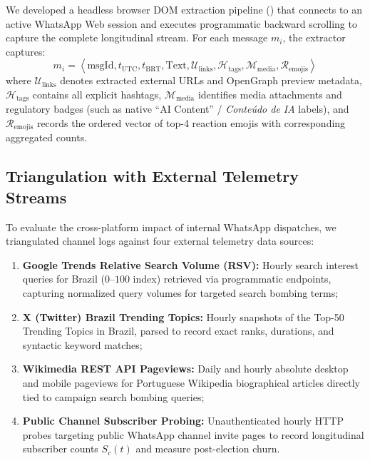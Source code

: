 \documentclass[preprint,12pt]{elsarticle}
\begin{document}
We developed a headless browser DOM extraction pipeline () that connects to an active WhatsApp Web session and executes programmatic backward scrolling to capture the complete longitudinal stream. For each message $m_i$, the extractor captures:
\begin{equation}
m_i = \left\langle \text{msgId}, t_{\text{UTC}}, t_{\text{BRT}}, \text{Text}, \mathcal{U}_{\text{links}}, \mathcal{H}_{\text{tags}}, \mathcal{M}_{\text{media}}, \mathcal{R}_{\text{emojis}} \right\rangle
\end{equation}
where $\mathcal{U}_{\text{links}}$ denotes extracted external URLs and OpenGraph preview metadata, $\mathcal{H}_{\text{tags}}$ contains all explicit hashtags, $\mathcal{M}_{\text{media}}$ identifies media attachments and regulatory badges (such as native ``AI Content'' / \textit{Conteúdo de IA} labels), and $\mathcal{R}_{\text{emojis}}$ records the ordered vector of top-4 reaction emojis with corresponding aggregated counts.

\subsection{Triangulation with External Telemetry Streams}
To evaluate the cross-platform impact of internal WhatsApp dispatches, we triangulated channel logs against four external telemetry data sources:
\begin{enumerate}
    \item \textbf{Google Trends Relative Search Volume (RSV):} Hourly search interest queries for Brazil ($0$--$100$ index) retrieved via programmatic endpoints, capturing normalized query volumes for targeted search bombing terms;
    \item \textbf{X (Twitter) Brazil Trending Topics:} Hourly snapshots of the Top-50 Trending Topics in Brazil, parsed to record exact ranks, durations, and syntactic keyword matches;
    \item \textbf{Wikimedia REST API Pageviews:} Daily and hourly absolute desktop and mobile pageviews for Portuguese Wikipedia biographical articles directly tied to campaign search bombing queries;
    \item \textbf{Public Channel Subscriber Probing:} Unauthenticated hourly HTTP probes targeting public WhatsApp channel invite pages to record longitudinal subscriber counts $S_c(t)$ and measure post-election churn.
\end{enumerate}
\end{document}
